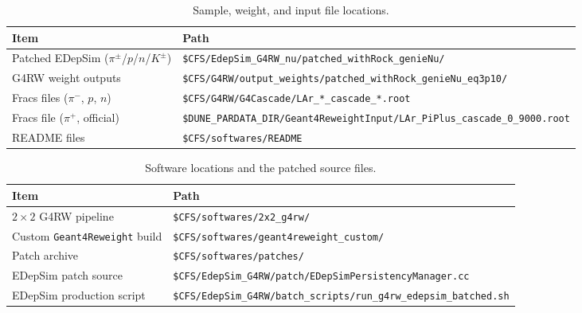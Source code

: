 \documentclass[%
article,
nofootinbib
]{revtex4-2}
\begin{document}
\begin{table}[H]
\centering
\caption{Sample, weight, and input file locations.}
\label{tab:loc_samples}
\setlength{\tabcolsep}{12pt}
\begin{tabular}{ll}
\hline\hline
Item & Path \\
\hline
Patched EDepSim ($\pi^{\pm}$/$p$/$n$/$K^{\pm}$)
  & \texttt{\$CFS/EdepSim\_G4RW\_nu/patched\_withRock\_genieNu/} \\
G4RW weight outputs
  & \texttt{\$CFS/G4RW/output\_weights/patched\_withRock\_genieNu\_eq3p10/} \\
Fracs files ($\pi^{-}$, $p$, $n$)
  & \texttt{\$CFS/G4RW/G4Cascade/LAr\_*\_cascade\_*.root} \\
Fracs file ($\pi^{+}$, official)
  & \texttt{\$DUNE\_PARDATA\_DIR/Geant4ReweightInput/LAr\_PiPlus\_cascade\_0\_9000.root} \\
README files
  & \texttt{\$CFS/softwares/README} \\
\hline\hline
\end{tabular}
\end{table}


\begin{table}[H]
\centering
\caption{Software locations and the patched source files.}
\label{tab:loc_software}
\setlength{\tabcolsep}{18pt}
\begin{tabular}{ll}
\hline\hline
Item & Path \\
\hline
$2\times2$ G4RW pipeline      & \texttt{\$CFS/softwares/2x2\_g4rw/} \\
Custom \texttt{Geant4Reweight} build & \texttt{\$CFS/softwares/geant4reweight\_custom/} \\
Patch archive                 & \texttt{\$CFS/softwares/patches/} \\
EDepSim patch source          & \texttt{\$CFS/EdepSim\_G4RW/patch/EDepSimPersistencyManager.cc} \\
EDepSim production script     & \texttt{\$CFS/EdepSim\_G4RW/batch\_scripts/run\_g4rw\_edepsim\_batched.sh} \\
\hline\hline
\end{tabular}
\end{table}



\end{document}

